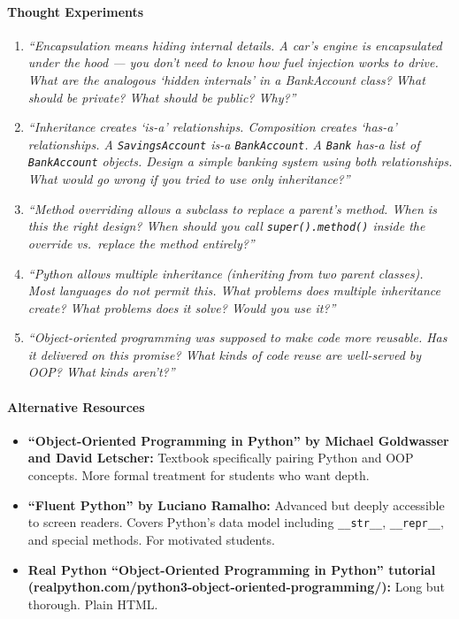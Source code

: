 \documentclass[
  justified,
  openright,
]{tufte-book}
\let\paragraph\paragraph
\let\paragraph\paragraph
\providecommand{\tightlist}{%
  \setlength{\itemsep}{0pt}\setlength{\parskip}{0pt}}
\begin{document}
\paragraph{Thought Experiments}\label{thought-experiments-14}

\begin{enumerate}
\def\labelenumi{\arabic{enumi}.}
\item
  \emph{``Encapsulation means hiding internal details. A car's engine is
  encapsulated under the hood --- you don't need to know how fuel
  injection works to drive. What are the analogous `hidden internals' in
  a BankAccount class? What should be private? What should be public?
  Why?''}
\item
  \emph{``Inheritance creates `is-a' relationships. Composition creates
  `has-a' relationships. A \texttt{SavingsAccount} is-a
  \texttt{BankAccount}. A \texttt{Bank} has-a list of
  \texttt{BankAccount} objects. Design a simple banking system using
  both relationships. What would go wrong if you tried to use only
  inheritance?''}
\item
  \emph{``Method overriding allows a subclass to replace a parent's
  method. When is this the right design? When should you call
  \texttt{super().method()} inside the override vs.~replace the method
  entirely?''}
\item
  \emph{``Python allows multiple inheritance (inheriting from two parent
  classes). Most languages do not permit this. What problems does
  multiple inheritance create? What problems does it solve? Would you
  use it?''}
\item
  \emph{``Object-oriented programming was supposed to make code more
  reusable. Has it delivered on this promise? What kinds of code reuse
  are well-served by OOP? What kinds aren't?''}
\end{enumerate}

\paragraph{Alternative Resources}\label{alternative-resources-5}

\begin{itemize}
\tightlist
\item
  \textbf{``Object-Oriented Programming in Python'' by Michael
  Goldwasser and David Letscher:} Textbook specifically pairing Python
  and OOP concepts. More formal treatment for students who want depth.
\item
  \textbf{``Fluent Python'' by Luciano Ramalho:} Advanced but deeply
  accessible to screen readers. Covers Python's data model including
  \texttt{\_\_str\_\_}, \texttt{\_\_repr\_\_}, and special methods. For
  motivated students.
\item
  \textbf{Real Python ``Object-Oriented Programming in Python'' tutorial
  (realpython.com/python3-object-oriented-programming/):} Long but
  thorough. Plain HTML.
\end{itemize}
\end{document}

